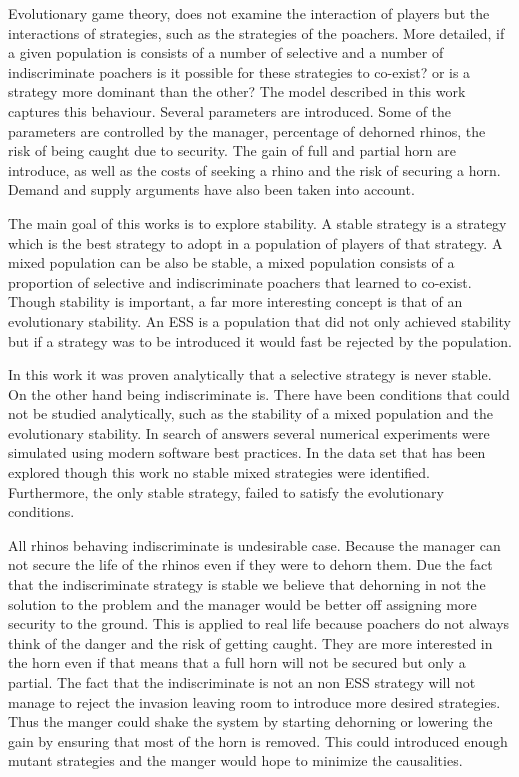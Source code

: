 \documentclass[10pt]{article}
\begin{document}
Evolutionary game theory, does not examine the interaction of players but the
interactions of strategies, such as the strategies of the poachers. More detailed,
if a given population is consists of a number of selective and a number of 
indiscriminate poachers is it possible for these strategies to co-exist? or 
is a strategy more dominant than the other? The model described in this
work captures this behaviour.  Several parameters are introduced. Some of
the parameters are controlled by the manager, percentage of dehorned rhinos,
the risk of being caught due to security. The gain of full and partial horn are
introduce, as well as the costs of seeking a rhino and the risk of securing 
a horn.  Demand and supply arguments have also been taken into account.

The main goal of this works is to explore stability. A stable strategy is a strategy
which is the best strategy to adopt in a population of players of that strategy. A mixed
population can be also be stable, a mixed population consists of a proportion
of selective and indiscriminate poachers that learned to co-exist. Though stability
is important, a far more interesting concept is that of an evolutionary stability.
An  ESS is a population that did not only achieved stability but  if a strategy
was to be introduced it would fast be rejected by the population.  

In this work it was proven analytically that a selective strategy is never stable. 
On the other hand being indiscriminate is. There have been conditions
that could not be studied analytically, such as the stability of a mixed 
population and the evolutionary stability. In search of answers several
numerical experiments were simulated using modern software best 
practices. In the data set that has been explored though this work no stable
mixed strategies were identified. Furthermore, the only stable strategy, failed
to satisfy the evolutionary conditions. 

All rhinos behaving indiscriminate is undesirable case. Because the manager can
not secure the life of the rhinos even if they were to dehorn them. Due the fact 
that the indiscriminate strategy is stable  we believe that dehorning in not the 
solution to the problem and the manager would be better off assigning more 
security to the ground. This is applied to real life because poachers 
do not always think of the danger and the risk of getting caught.
They are more interested in the horn even if that means that a full horn will
not be secured but only a partial. The fact that the indiscriminate is not
an non ESS strategy will not manage to reject the invasion leaving
room to introduce more desired strategies.
Thus the manger could shake  the system by starting dehorning or lowering
the gain by ensuring that most of the horn is removed. This
could introduced enough mutant strategies and the manger would
hope to minimize the causalities.



\end{document}
